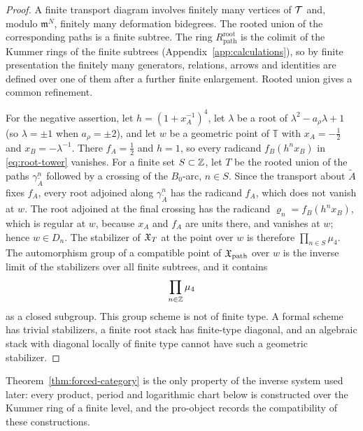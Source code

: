 \begin{proof}
A finite transport diagram involves finitely many vertices of $\mathcal T$ and,
modulo $\mathfrak m^N$, finitely many deformation bidegrees.  The rooted union of the
corresponding paths is a finite subtree.  The ring
$R_{\mathrm{path}}^{\mathrm{root}}$ is the colimit of the Kummer rings of the
finite subtrees (Appendix~\ref{app:calculations}), so by finite
presentation the finitely many generators, relations, arrows and identities
are defined over one of them after a further finite enlargement.  Rooted union gives a common
refinement.

For the negative assertion, let $h=(1+x_A^{-1})^4$, let $\lambda$ be a root
of $\lambda^2-a_\rho\lambda+1$ (so $\lambda=\pm1$ when $a_\rho=\pm2$), and let $w$ be a
geometric point of $\mathbb T$ with $x_A=-\frac12$ and $x_B=-\lambda^{-1}$.  There
$f_A=\frac12$ and $h=1$, so every radicand $f_B(h^nx_B)$ in
\eqref{eq:root-tower} vanishes.  For a finite set $S\subset\mathbb Z$, let $T$ be
the rooted union of the paths $\gamma_{\widetilde A}^n$ followed by a
crossing of the $B_0$-arc, $n\in S$.  Since the transport about
$\widetilde A$ fixes $f_A$, every root adjoined along
$\gamma_{\widetilde A}^n$ has the radicand $f_A$, which does not vanish at
$w$.  The root adjoined at the final crossing has the radicand
$\varrho_n=f_B(h^nx_B)$, which is regular at $w$, because $x_A$ and $f_A$ are units
there, and vanishes at $w$; hence $w\in D_n$.  The stabilizer of
$\mathfrak X_T$ at the point over $w$ is therefore $\prod_{n\in S}\mu_4$.
The automorphism group of a compatible point of $\mathfrak X_{\mathrm{path}}$ over
$w$ is the inverse limit of the stabilizers over all finite subtrees, and it
contains
\[
 \prod_{n\in\mathbb Z}\mu_4
\]
as a closed subgroup.  This group scheme is not of finite type.  A formal
scheme has trivial stabilizers, a finite root stack has finite-type
diagonal, and an algebraic stack with diagonal locally of finite type cannot
have such a geometric stabilizer.
\end{proof}

Theorem~\ref{thm:forced-category} is the only property of the inverse
system used later: every product, period and logarithmic chart below is
constructed over the Kummer ring of a finite level, and the pro-object
records the compatibility of these constructions.
